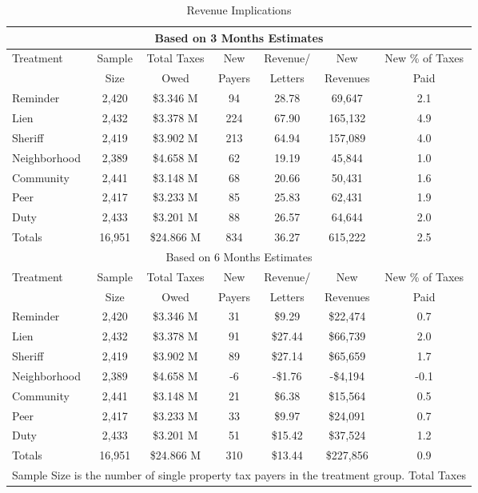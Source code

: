 \documentclass[12pt]{article}
\begin{document}
\begin{table}[htbp]
\centering
\caption{Revenue Implications}\label{rev}
\begin{tabular}{lcccccc}
\hline
\multicolumn{7}{c}{Based on 3 Months Estimates} \\
\hline
Treatment & Sample & Total Taxes & New  & Revenue/ & New  & New \% of Taxes
\\
& Size & Owed & Payers & Letters & Revenues & Paid\\
\hline
Reminder & 2,420 & \$3.346 M & 94	& 28.78 & 69,647	& 2.1  \\
Lien & 2,432 & \$3.378 M &  224 & 67.90	& 165,132	& 4.9 \\
Sheriff & 2,419 & \$3.902 M & 213 & 64.94 & 157,089 & 4.0  \\
Neighborhood & 2,389 & \$4.658 M & 62 & 19.19 & 45,844 & 1.0  \\
Community & 2,441 & \$3.148 M & 68 & 20.66 & 50,431 & 1.6  \\
Peer & 2,417 & \$3.233 M & 85	& 25.83 & 62,431 & 1.9  \\
Duty & 2,433 & \$3.201 M & 88	& 26.57 & 64,644	& 2.0  \\
\hline
Totals & 16,951 & \$24.866 M & 834	& 36.27 & 615,222 & 2.5  \\
\hline
\multicolumn{7}{c}{Based on 6 Months Estimates} \\
\hline
Treatment & Sample & Total Taxes & New & Revenue/ & New & New \% of Taxes \\
 & Size & Owed & Payers & Letters & Revenues & Paid \\
  \hline
Reminder & 2,420 & \$3.346 M & 31 & \$9.29 & \$22,474 & 0.7 \\
  Lien & 2,432 & \$3.378 M & 91 & \$27.44 & \$66,739 & 2.0 \\
  Sheriff & 2,419 & \$3.902 M & 89 & \$27.14 & \$65,659 & 1.7 \\
  Neighborhood & 2,389 & \$4.658 M & -6 & -\$1.76 & -\$4,194 & -0.1 \\
  Community & 2,441 & \$3.148 M & 21 & \$6.38 & \$15,564 & 0.5 \\
  Peer & 2,417 & \$3.233 M & 33 & \$9.97 & \$24,091 & 0.7 \\
  Duty & 2,433 & \$3.201 M & 51 & \$15.42 & \$37,524 & 1.2 \\
   \hline
Totals & 16,951 & \$24.866 M & 310 & \$13.44 & \$227,856 & 0.9 \\
   \hline
\multicolumn{7}{p{1\textwidth}}{\scriptsize* Sample Size is the number
  of single property tax payers in the treatment group.  Total Taxes
}
\end{tabular}
\end{table}
\end{document}

